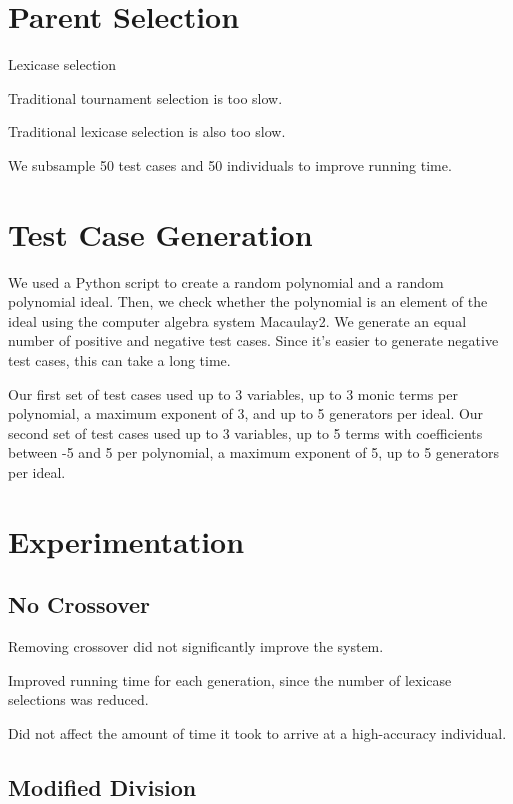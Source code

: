 \documentclass[20pt]{extarticle}
\begin{document}
\newpage
\section*{Parent Selection}

Lexicase selection

Traditional tournament selection is too slow.

Traditional lexicase selection is also too slow. 

We subsample 50 test cases and 50 individuals to improve running time.

\newpage
\section*{Test Case Generation}

We used a Python script to create a random polynomial and a random polynomial ideal.
Then, we check whether the polynomial is an element of the ideal using the computer algebra system Macaulay2.
We generate an equal number of positive and negative test cases.
Since it's easier to generate negative test cases, this can take a long time.

Our first set of test cases used up to 3 variables, up to 3 monic terms per polynomial, a maximum exponent of 3, and up to 5 generators per ideal.
Our second set of test cases used up to 3 variables, up to 5 terms with coefficients between -5 and 5 per polynomial, a maximum exponent of 5, up to 5 generators per ideal.


\newpage
\section*{Experimentation}
\subsection*{No Crossover}

Removing crossover did not significantly improve the system.

Improved running time for each generation, since the number of lexicase selections was reduced. 

Did not affect the amount of time it took to arrive at a high-accuracy individual.

\subsection*{Modified Division}
\end{document}
